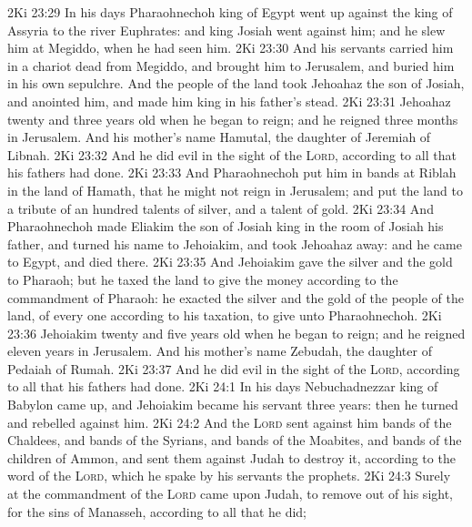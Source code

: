 \vs 2Ki 23:29 In his days Pharaohnechoh king of Egypt went up against the king of Assyria to the river Euphrates: and king Josiah went against him; and he slew him at Megiddo, when he had seen him.
\vs 2Ki 23:30 And his servants carried him in a chariot dead from Megiddo, and brought him to Jerusalem, and buried him in his own sepulchre. And the people of the land took Jehoahaz the son of Josiah, and anointed him, and made him king in his father's stead.
\vs 2Ki 23:31 Jehoahaz  twenty and three years old when he began to reign; and he reigned three months in Jerusalem. And his mother's name  Hamutal, the daughter of Jeremiah of Libnah.
\vs 2Ki 23:32 And he did  evil in the sight of the \textsc{Lord}, according to all that his fathers had done.
\vs 2Ki 23:33 And Pharaohnechoh put him in bands at Riblah in the land of Hamath, that he might not reign in Jerusalem; and put the land to a tribute of an hundred talents of silver, and a talent of gold.
\vs 2Ki 23:34 And Pharaohnechoh made Eliakim the son of Josiah king in the room of Josiah his father, and turned his name to Jehoiakim, and took Jehoahaz away: and he came to Egypt, and died there.
\vs 2Ki 23:35 And Jehoiakim gave the silver and the gold to Pharaoh; but he taxed the land to give the money according to the commandment of Pharaoh: he exacted the silver and the gold of the people of the land, of every one according to his taxation, to give  unto Pharaohnechoh.
\vs 2Ki 23:36 Jehoiakim  twenty and five years old when he began to reign; and he reigned eleven years in Jerusalem. And his mother's name  Zebudah, the daughter of Pedaiah of Rumah.
\vs 2Ki 23:37 And he did  evil in the sight of the \textsc{Lord}, according to all that his fathers had done.
\vs 2Ki 24:1 In his days Nebuchadnezzar king of Babylon came up, and Jehoiakim became his servant three years: then he turned and rebelled against him.
\vs 2Ki 24:2 And the \textsc{Lord} sent against him bands of the Chaldees, and bands of the Syrians, and bands of the Moabites, and bands of the children of Ammon, and sent them against Judah to destroy it, according to the word of the \textsc{Lord}, which he spake by his servants the prophets.
\vs 2Ki 24:3 Surely at the commandment of the \textsc{Lord} came  upon Judah, to remove  out of his sight, for the sins of Manasseh, according to all that he did;
